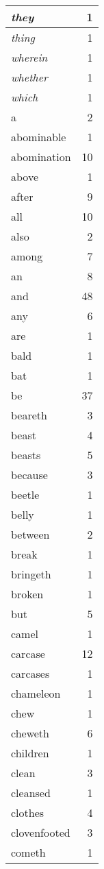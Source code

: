 \begin{center}
\begin{longtable}{l|r}
\emph{they} & 1 \\ \hline
\emph{thing} & 1 \\ \hline
\emph{wherein} & 1 \\ \hline
\emph{whether} & 1 \\ \hline
\emph{which} & 1 \\ \hline
a & 2 \\ \hline
abominable & 1 \\ \hline
abomination & 10 \\ \hline
above & 1 \\ \hline
after & 9 \\ \hline
all & 10 \\ \hline
also & 2 \\ \hline
among & 7 \\ \hline
an & 8 \\ \hline
and & 48 \\ \hline
any & 6 \\ \hline
are & 1 \\ \hline
bald & 1 \\ \hline
bat & 1 \\ \hline
be & 37 \\ \hline
beareth & 3 \\ \hline
beast & 4 \\ \hline
beasts & 5 \\ \hline
because & 3 \\ \hline
beetle & 1 \\ \hline
belly & 1 \\ \hline
between & 2 \\ \hline
break & 1 \\ \hline
bringeth & 1 \\ \hline
broken & 1 \\ \hline
but & 5 \\ \hline
camel & 1 \\ \hline
carcase & 12 \\ \hline
carcases & 1 \\ \hline
chameleon & 1 \\ \hline
chew & 1 \\ \hline
cheweth & 6 \\ \hline
children & 1 \\ \hline
clean & 3 \\ \hline
cleansed & 1 \\ \hline
clothes & 4 \\ \hline
clovenfooted & 3 \\ \hline
cometh & 1 \\ \hline

\end{longtable}
\end{center}
